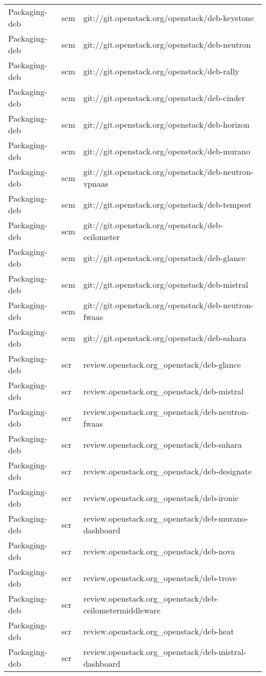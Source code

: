 \begin{center}
\begin{longtable}{|p{4cm}|p{1cm}|p{10cm}|}
Packaging-deb&scm&git://git.openstack.org/openstack/deb-keystone\\ 
Packaging-deb&scm&git://git.openstack.org/openstack/deb-neutron\\ 
Packaging-deb&scm&git://git.openstack.org/openstack/deb-rally\\ 
Packaging-deb&scm&git://git.openstack.org/openstack/deb-cinder\\ 
Packaging-deb&scm&git://git.openstack.org/openstack/deb-horizon\\ 
Packaging-deb&scm&git://git.openstack.org/openstack/deb-murano\\ 
Packaging-deb&scm&git://git.openstack.org/openstack/deb-neutron-vpnaas\\ 
Packaging-deb&scm&git://git.openstack.org/openstack/deb-tempest\\ 
Packaging-deb&scm&git://git.openstack.org/openstack/deb-ceilometer\\ 
Packaging-deb&scm&git://git.openstack.org/openstack/deb-glance\\ 
Packaging-deb&scm&git://git.openstack.org/openstack/deb-mistral\\ 
Packaging-deb&scm&git://git.openstack.org/openstack/deb-neutron-fwaas\\ 
Packaging-deb&scm&git://git.openstack.org/openstack/deb-sahara\\ 
Packaging-deb&scr&review.openstack.org\_openstack/deb-glance\\ 
Packaging-deb&scr&review.openstack.org\_openstack/deb-mistral\\ 
Packaging-deb&scr&review.openstack.org\_openstack/deb-neutron-fwaas\\ 
Packaging-deb&scr&review.openstack.org\_openstack/deb-sahara\\ 
Packaging-deb&scr&review.openstack.org\_openstack/deb-designate\\ 
Packaging-deb&scr&review.openstack.org\_openstack/deb-ironic\\ 
Packaging-deb&scr&review.openstack.org\_openstack/deb-murano-dashboard\\ 
Packaging-deb&scr&review.openstack.org\_openstack/deb-nova\\ 
Packaging-deb&scr&review.openstack.org\_openstack/deb-trove\\ 
Packaging-deb&scr&review.openstack.org\_openstack/deb-ceilometermiddleware\\ 
Packaging-deb&scr&review.openstack.org\_openstack/deb-heat\\ 
Packaging-deb&scr&review.openstack.org\_openstack/deb-mistral-dashboard\\ 

\end{longtable}
\end{center}
